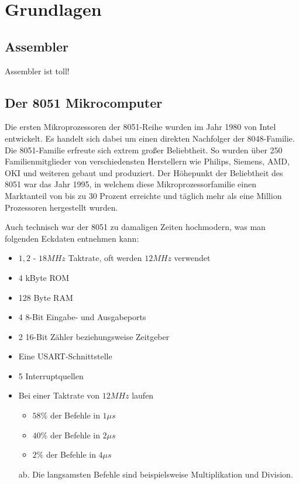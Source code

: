\chapter{Grundlagen}

\section{Assembler}

Assembler ist toll!

\section{Der 8051 Mikrocomputer}

Die ersten Mikroprozessoren der 8051-Reihe wurden im Jahr 1980 von Intel entwickelt. Es handelt sich dabei um einen direkten Nachfolger der 8048-Familie.
Die 8051-Familie erfreute sich extrem großer Beliebtheit. So wurden über 250 Familienmitglieder von verschiedensten Herstellern wie Philips, Siemens, AMD, OKI und weiteren gebaut und produziert. Der Höhepunkt der Beliebtheit des 8051 war das Jahr 1995, in welchem diese Mikroprozessorfamilie einen Marktanteil von bis zu 30 Prozent erreichte und täglich mehr als eine Million Prozessoren hergestellt wurden.

Auch technisch war der 8051 zu damaligen Zeiten hochmodern, was man folgenden Eckdaten entnehmen kann:
\begin{itemize}
	\item $1,2$ - $18 MHz$ Taktrate, oft werden $12 MHz$ verwendet
	\item 4 kByte ROM
	\item 128 Byte RAM
	\item 4 8-Bit Eingabe- und Ausgabeports
	\item 2 16-Bit Zähler beziehungsweise Zeitgeber
	\item Eine USART-Schnittstelle
	\item 5 Interruptquellen
	\item Bei einer Taktrate von $12 MHz$ laufen
	      \begin{itemize}
		      \item $58\%$ der Befehle in $1 \mu s$
		      \item $40\%$ der Befehle in $2 \mu s$
		      \item $2\%$ der Befehle in $4 \mu s$
	      \end{itemize}
	      ab. Die langsamsten Befehle sind beispielsweise Multiplikation und Division.
\end{itemize}



